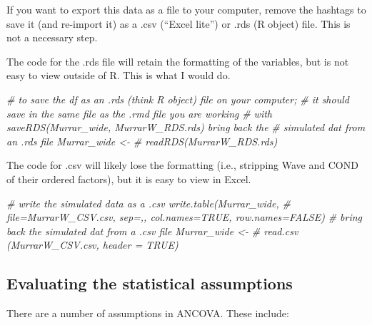 \documentclass[
  11pt,
]{book}
\newenvironment{Shaded}{\begin{snugshade}}{\end{snugshade}}
\newcommand{\CommentTok}[1]{\textcolor[rgb]{0.37,0.37,0.37}{\textit{#1}}}
\begin{document}
If you want to export this data as a file to your computer, remove the hashtags to save it (and re-import it) as a .csv (``Excel lite'') or .rds (R object) file. This is not a necessary step.

The code for the .rds file will retain the formatting of the variables, but is not easy to view outside of R. This is what I would do.

\begin{Shaded}
\begin{Highlighting}[]
\CommentTok{\# to save the df as an .rds (think \textquotesingle{}R object\textquotesingle{}) file on your computer;}
\CommentTok{\# it should save in the same file as the .rmd file you are working}
\CommentTok{\# with saveRDS(Murrar\_wide, \textquotesingle{}MurrarW\_RDS.rds\textquotesingle{}) bring back the}
\CommentTok{\# simulated dat from an .rds file Murrar\_wide \textless{}{-}}
\CommentTok{\# readRDS(\textquotesingle{}MurrarW\_RDS.rds\textquotesingle{})}
\end{Highlighting}
\end{Shaded}

The code for .csv will likely lose the formatting (i.e., stripping Wave and COND of their ordered factors), but it is easy to view in Excel.

\begin{Shaded}
\begin{Highlighting}[]
\CommentTok{\# write the simulated data as a .csv write.table(Murrar\_wide,}
\CommentTok{\# file=\textquotesingle{}MurrarW\_CSV.csv\textquotesingle{}, sep=\textquotesingle{},\textquotesingle{}, col.names=TRUE, row.names=FALSE)}
\CommentTok{\# bring back the simulated dat from a .csv file Murrar\_wide \textless{}{-}}
\CommentTok{\# read.csv (\textquotesingle{}MurrarW\_CSV.csv\textquotesingle{}, header = TRUE)}
\end{Highlighting}
\end{Shaded}

\hypertarget{evaluating-the-statistical-assumptions-5}{%
\subsection{Evaluating the statistical assumptions}\label{evaluating-the-statistical-assumptions-5}}

There are a number of assumptions in ANCOVA. These include:
\end{document}
